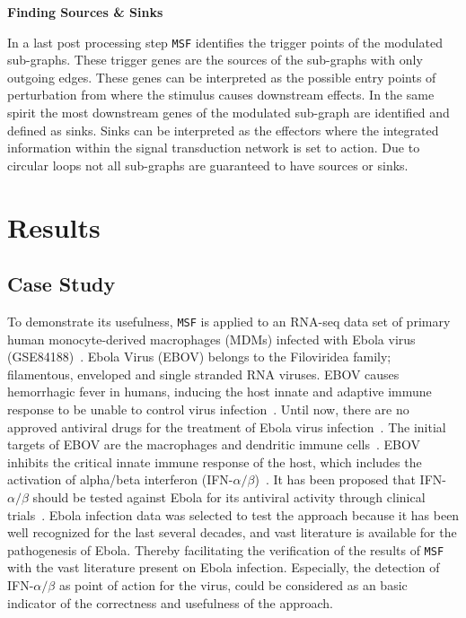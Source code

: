 \documentclass[10pt,a4paper,twocolumn]{article}
\begin{document}
\textbf{Finding Sources \& Sinks}

In a last post processing step \texttt{MSF} identifies the trigger points
of the modulated sub-graphs. These trigger genes are the sources of the
sub-graphs with only outgoing edges. These genes can be interpreted as the
possible entry points of perturbation from where the stimulus causes
downstream effects. In the same spirit the most downstream genes of the
modulated sub-graph are identified and defined as sinks. Sinks can be
interpreted as the effectors where the integrated information within the
signal transduction network is set to action. Due to circular loops not all
sub-graphs are guaranteed to have sources or sinks.


\section*{Results}

\subsection*{Case Study}

To demonstrate its usefulness, \texttt{MSF} is applied to an RNA-seq data
set of primary human monocyte-derived macrophages (MDMs) infected with
Ebola virus (GSE84188)~\cite{Olejnik}. Ebola Virus (EBOV) belongs to the
Filoviridea family; filamentous, enveloped and single stranded RNA
viruses. EBOV causes hemorrhagic fever in humans, inducing the host innate
and adaptive immune response to be unable to control virus
infection~\cite{Prins}. Until now, there are no approved antiviral drugs
for the treatment of Ebola virus infection~\cite{Konde,Rhein}.  The initial
targets of EBOV are the macrophages and dendritic immune
cells~\cite{Falasca,Rhein}. EBOV inhibits the critical innate immune
response of the host, which includes the activation of alpha/beta
interferon (IFN-$\alpha / \beta$)~\cite{Prins,Konde,Cardenas}. It has been
proposed that IFN-$\alpha / \beta$ should be tested against Ebola for its
antiviral activity through clinical trials~\cite{Konde}. Ebola infection
data was selected to test the approach because it has been well recognized for the last several decades, and vast literature is available for the pathogenesis of Ebola. Thereby facilitating the verification of the results of
\texttt{MSF} with the vast literature present on Ebola
infection. Especially, the detection of IFN-$\alpha / \beta$ as point of
action for the virus, could be considered as an basic indicator of the
correctness and usefulness of the approach.
\end{document}
